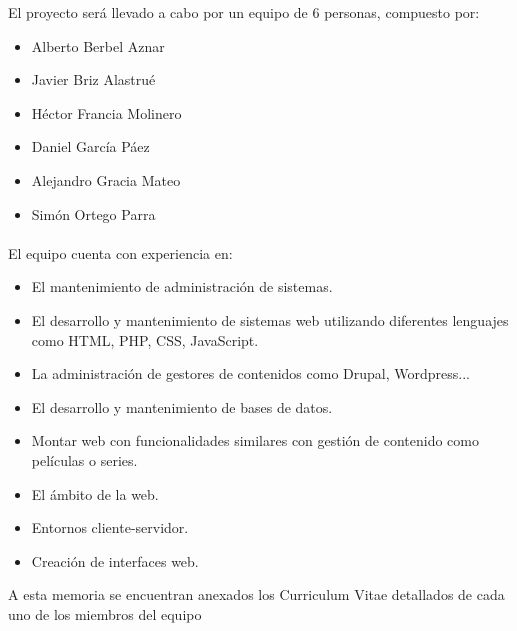 El proyecto será llevado a cabo por un equipo de 6 personas, compuesto por:
\begin{itemize}
\item Alberto Berbel Aznar
\item Javier Briz Alastrué
\item Héctor Francia Molinero
\item Daniel García Páez
\item Alejandro Gracia Mateo
\item Simón Ortego Parra
\end{itemize}

\paragraph{} El equipo cuenta con experiencia en:
\begin{itemize}

\item El mantenimiento de administración de sistemas.
\item El desarrollo y mantenimiento de sistemas web utilizando diferentes lenguajes como HTML, PHP, CSS, JavaScript.
\item La administración de gestores de contenidos como Drupal, Wordpress... 
\item El desarrollo y mantenimiento de bases de datos.
\item Montar web con funcionalidades similares con gestión de contenido como películas o series.
\item El ámbito de la web.
\item Entornos cliente-servidor.
\item Creación de interfaces web.

\end{itemize}

A esta memoria se encuentran anexados los Curriculum Vitae detallados de cada uno de los miembros del equipo